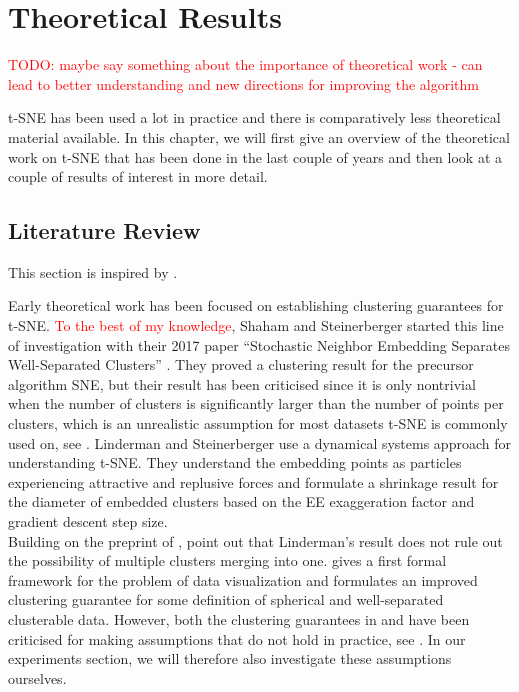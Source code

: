 \chapter{Theoretical Results}\label{chapter:theoretical_results}
\textcolor{red}{TODO: maybe say something about the importance of theoretical work - can lead to better understanding and new directions for improving the algorithm}

t-SNE has been used a lot in practice and there is comparatively less theoretical material available. 
In this chapter, we will first give an overview of the theoretical work on t-SNE that has been done in the last couple of years and then look at a couple of results of interest in more detail. 

\section{Literature Review}
This section is inspired by \cite{murray2024largedatalimitsscaling}. 

Early theoretical work has been focused on establishing clustering guarantees for t-SNE. 
\textcolor{red}{To the best of my knowledge}, Shaham and Steinerberger started this line of investigation with their 2017 paper \enquote{Stochastic Neighbor Embedding Separates Well-Separated Clusters} \cite{shaham17}. 
They proved a clustering result for the precursor algorithm SNE, but their result has been criticised since it is only nontrivial when the number of clusters is significantly larger than the number of points per clusters, which is an unrealistic assumption for most datasets t-SNE is commonly used on, see \cite{Arora18}.  
Linderman and Steinerberger \cite{LinStei22} use a dynamical systems approach for understanding t-SNE. 
They understand the embedding points as particles experiencing attractive and replusive forces and formulate a shrinkage result for the diameter of embedded clusters based on the EE exaggeration factor and gradient descent step size. \\
Building on the preprint of \cite{LinStei22}, \cite{Arora18} point out that Linderman's result does not rule out the possibility of multiple clusters merging into one. 
\cite{Arora18} gives a first formal framework for the problem of data visualization and formulates an improved clustering guarantee for some definition of spherical and well-separated clusterable data. 
However, both the clustering guarantees in \cite{Arora18} and \cite{LinStei22} have been criticised for making assumptions that do not hold in practice, see \cite{yang2021tsneoptimizedrevealclusters}. In our experiments section, we will therefore also investigate these assumptions ourselves. 


